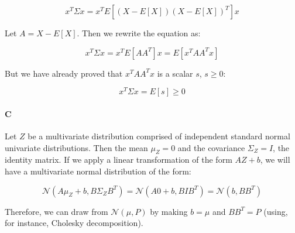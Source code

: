 \documentclass[12pt]{article}
\begin{document}
\[
x^T\Sigma x=x^TE\left[\left(X-E[X]\right)\left(X-E[X]\right)^T\right]x
\]

Let $A=X-E[X]$. Then we rewrite the equation as:

\[
x^T\Sigma x=x^TE\left[AA^T\right]x = E\left[x^TAA^Tx\right]
\]

But we have already proved that $x^TAA^Tx$ is a scalar $s$, $s \geq 0$:

\[
x^T\Sigma x  =E\left[s\right] \geq 0
\]

\paragraph{C}
Let $Z$ be a multivariate distribution comprised of independent standard normal univariate distributions. Then the mean $\mu_Z = 0$ and the covariance $\Sigma_Z=I$, the identity matrix. If we apply a linear transformation of the form $AZ + b$, we will have a multivariate normal distribution of the form:

\[
\mathcal{N}\left(A\mu_Z + b, B\Sigma_Z B^T\right) = \mathcal{N}\left(A0 + b, BIB^T\right) = \mathcal{N}\left(b, BB^T\right)
\]

Therefore, we can draw from $\mathcal{N}\left(\mu,P\right)$ by making $b=\mu$ and $BB^T=P$ (using, for instance, Cholesky decomposition).
\end{document}
